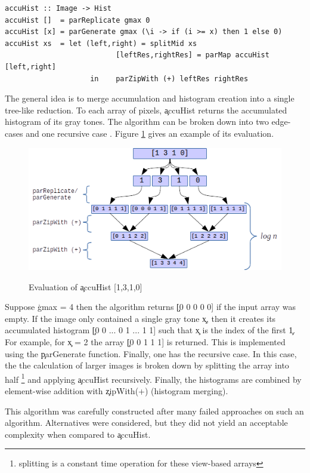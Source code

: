  \begin{lstlisting}
accuHist :: Image -> Hist
accuHist []  = parReplicate gmax 0
accuHist [x] = parGenerate gmax (\i -> if (i >= x) then 1 else 0)
accuHist xs  = let (left,right) = splitMid xs
                          [leftRes,rightRes] = parMap accuHist [left,right]
                    in    parZipWith (+) leftRes rightRes
  \end{lstlisting}
  The general idea is to merge accumulation and histogram creation
  into a single tree-like reduction. To each array of pixels, \c{accuHist}
  returns the accumulated histogram of its gray tones.
  The algorithm can be broken down into two edge-cases and one recursive case
  . Figure \ref{figure:accuHist} gives an example of its evaluation.
  
  \begin{figure}[h]
    \centering
    \includegraphics[width=\linewidth]{accuHist}
    \label{figure:accuHist}
    \caption[Parallel Histogram Accumulation]{Evaluation of \c{accuHist [1,3,1,0]}}
  \end{figure}
  
  Suppose \c{gmax = 4} then the algorithm returns \c{[0 0 0 0 0]} if
  the input array was empty. If the image only contained a single gray tone
  \c{x}, then it creates its accumulated histogram
  \c{[0 0 ... 0 1 ... 1 1]} such that \c{x} is the index
  of the first \c{1}.
  For example, for \c{x = 2} the array
  \c{[0 0 1 1 1]} is returned. This is implemented using the \c{parGenerate} function.
  Finally, one has the recursive case. In this case, the the calculation
  of larger images is broken down by splitting the array into half
  \footnote{splitting is a constant time operation
  for these view-based arrays} and applying \c{accuHist}
  recursively.
  Finally, the histograms are combined by element-wise addition
  with \c{zipWith(+)} (histogram merging).
  
  This algorithm was carefully constructed after many failed approaches
  on such an algorithm. Alternatives were considered, but they did not
  yield an acceptable complexity when compared to \c{accuHist}.

